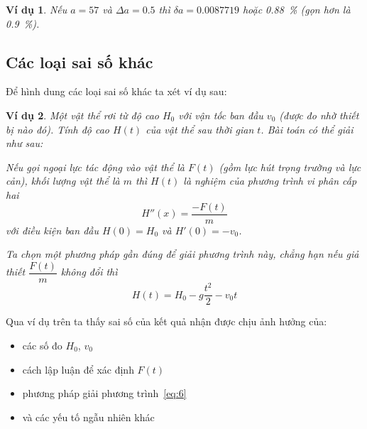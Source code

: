 \documentclass{book}
\newtheorem{exmp}{Ví dụ}[chapter]
\begin{document}
\begin{exmp}
    Nếu \(a = \num{57}\) và \(\Delta a = \num{0.5}\) thì \(\delta a =
    \num{0.0087719}\) hoặc \SI{0.88}{\percent} (gọn hơn là \SI{0.9}{\percent}).
\end{exmp}

\subsection{Các loại sai số khác}

Để hình dung các loại sai số khác ta xét ví dụ sau:

\begin{exmp}
    Một vật thể rơi từ độ cao \(H_0\) với vận tốc ban đầu \(v_0\) (được đo nhờ
    thiết bị nào đó). Tính độ cao \(H(t)\) của vật thể sau thời gian \(t\). Bài
    toán có thể giải như sau:

    Nếu gọi ngoại lực tác động vào vật thể là \(F(t)\) (gồm lực hút trọng trường
    và lực cản), khối lượng vật thể là \(m\) thì \(H(t)\) là nghiệm của phương
    trình vi phân cấp hai
    \begin{equation} \label{eq:6}
        H''(x) = \frac{-F(t)}{m}
    \end{equation}
    với điều kiện ban đầu \(H(0) = H_0\) và \(H'(0) = -v_0\).

    Ta chọn một phương pháp gần đúng để giải phương trình này, chẳng hạn nếu giả
    thiết \(\dfrac{F(t)}{m}\) không đổi thì
    \[H(t) = H_0 - g\frac{t^2}{2} -v_0 t\]
\end{exmp}

Qua ví dụ trên ta thấy sai số của kết quả nhận được chịu ảnh hưởng của:
\begin{itemize}
    \item các số đo \(H_0\), \(v_0\)
    \item cách lập luận để xác định \(F(t)\)
    \item phương pháp giải phương trình~\ref{eq:6}
    \item và các yếu tố ngẫu nhiên khác
\end{itemize}
\end{document}
